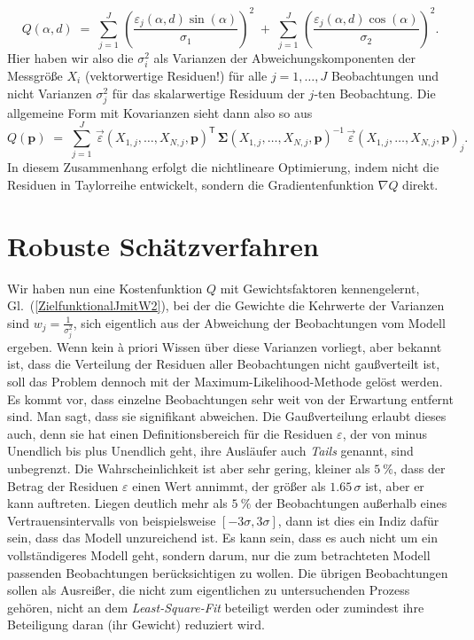 \begin{equation}
Q(\alpha, d) \; = \;
\sum\limits_{j=1}^J \,  \left(\frac{\varepsilon_j(\alpha, d) \sin(\alpha)}{\sigma_1}\right)^2
\; + \; \sum\limits_{j=1}^J \, \left(\frac{\varepsilon_j(\alpha, d) \cos(\alpha)}{\sigma_2}\right)^2 .
\end{equation}
Hier haben wir also die $\sigma_i^2$ als Varianzen der Abweichungskomponenten
der Messgröße $X_i$ (vektorwertige Residuen!) für alle $j=1,\dots,J$ Beobachtungen
und nicht Varianzen $\sigma_j^2$ für das skalarwertige Residuum der $j$-ten Beobachtung.
Die allgemeine Form mit Kovarianzen sieht dann also so aus
\begin{equation}
Q(\mathbf{p}) \; = \;
 \sum\limits_{j=1}^J \, \vec \varepsilon(X_{1,j},\dots,X_{N,j},\mathbf{p})^\mathsf{T} \, 
\boldsymbol{\Sigma}(X_{1,j},\dots,X_{N,j},\mathbf{p})^{-1} \, \vec \varepsilon(X_{1,j},\dots,X_{N,j},\mathbf{p})_j .
\label{generalLSmethod}
\end{equation}
In diesem Zusammenhang erfolgt die nichtlineare Optimierung, indem nicht
die Residuen in Taylorreihe entwickelt, sondern die Gradientenfunktion $\nabla Q$ direkt.


\section{Robuste Schätzverfahren}
\label{robustEstimation}

Wir haben nun eine Kostenfunktion $Q$ mit Gewichtsfaktoren kennengelernt, Gl.~(\ref{ZielfunktionalJmitW2}),
bei der die Gewichte die Kehrwerte der Varianzen sind $w_j = \frac{1}{\sigma_j^2}$, sich eigentlich
aus der Abweichung der Beobachtungen vom Modell ergeben. Wenn kein {\`a} priori Wissen über
diese Varianzen vorliegt, aber bekannt ist, dass die Verteilung der
Residuen aller Beobachtungen nicht gauß\-ver\-teilt ist, soll das Problem dennoch mit der
Maximum-Likelihood-Methode gelöst werden. Es kommt vor, dass einzelne Beobachtungen
sehr weit von der Erwartung entfernt sind. Man sagt, dass sie signifikant abweichen. Die Gaußverteilung
erlaubt dieses auch, denn sie hat einen Definitionsbereich für die Residuen $\varepsilon$,
der von minus Unendlich bis plus Unendlich geht, ihre Ausläufer auch \textsl{Tails} genannt,
sind unbegrenzt. Die Wahrscheinlichkeit ist aber sehr gering, kleiner als $5~\%$, dass der Betrag der
Residuen $\varepsilon$ einen Wert annimmt, der größer als
$1.65 \, \sigma$ ist, aber er kann auftreten. Liegen deutlich mehr als $5~\%$
der Beobachtungen außerhalb eines Vertrauensintervalls von beispielsweise $[-3 \sigma, 3 \sigma]$,
dann ist dies ein Indiz dafür sein, dass das Modell unzureichend ist. Es kann sein, dass es auch nicht
um ein vollständigeres Modell geht, sondern darum, nur die zum betrachteten Modell passenden Beobachtungen
berücksichtigen zu wollen. Die übrigen Beobachtungen sollen als Ausreißer, die nicht zum
eigentlichen zu untersuchenden Prozess gehören, nicht an dem \textsl{Least-Square-Fit}
beteiligt werden oder zumindest ihre Beteiligung daran (ihr Gewicht) reduziert wird.

